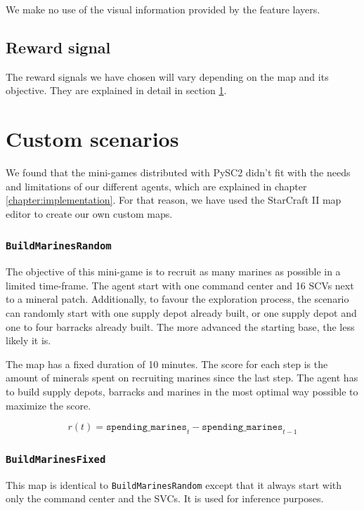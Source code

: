 We make no use of the visual information provided by the feature layers.

\subsection{Reward signal}

The reward signals we have chosen will vary depending on the map and its objective. They are explained in detail in section \ref{sec:mini-games}.

\section{Custom scenarios}
\label{sec:mini-games}

We found that the mini-games distributed with PySC2 didn't fit with the needs and limitations of our different agents, which are explained in chapter \ref{chapter:implementation}. For that reason, we have used the StarCraft II map editor to create our own custom maps.

\subsubsection*{\texttt{BuildMarinesRandom}}

The objective of this mini-game is to recruit as many marines as possible in a limited time-frame. The agent start with one command center and 16 SCVs next to a mineral patch. Additionally, to favour the exploration process, the scenario can randomly start with one supply depot already built, or one supply depot and one to four barracks already built. The more advanced the starting base, the less likely it is.

The map has a fixed duration of 10 minutes. The score for each step is the amount of minerals spent on recruiting marines since the last step. The agent has to build supply depots, barracks and marines in the most optimal way possible to maximize the score.

$$
r(t) = \texttt{spending\_marines}_{t} - \texttt{spending\_marines}_{t-1}
$$

\subsubsection*{\texttt{BuildMarinesFixed}}

This map is identical to \texttt{BuildMarinesRandom} except that it always start with only the command center and the SVCs. It is used for inference purposes.

